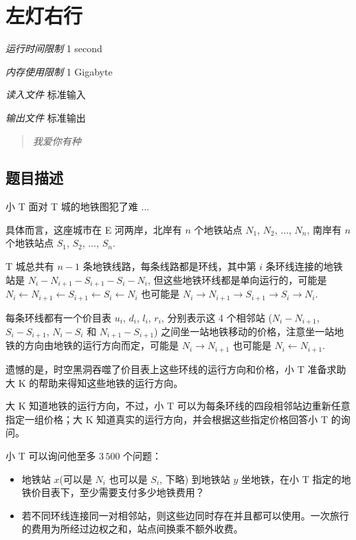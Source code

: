 \section[D. 左灯右行]{ 左灯右行}

\textit{运行时间限制}   1 second

\textit{内存使用限制} 1 Gigabyte

\textit{读入文件} \qquad 标准输入

\textit{输出文件} \qquad 标准输出


\begin{quote}
	\textit{我爱你有种}
\end{quote}



\subsection{题目描述}

小 T 面对 T 城的地铁图犯了难 ...

具体而言，这座城市在 E 河两岸，北岸有 $n$ 个地铁站点 $N_1$, $N_2$, $\ldots$, $N_n$, 南岸有 $n$ 个地铁站点 $S_1$, $S_2$, $\ldots$, $S_n$.

T 城总共有 $n - 1$ 条地铁线路，每条线路都是环线，其中第 $i$ 条环线连接的地铁站是 $N_i - N_{i + 1} - S_{i + 1} - S_i - N_i$, 但这些地铁环线都是单向运行的，可能是 $N_i \leftarrow N_{i + 1} \leftarrow S_{i + 1} \leftarrow S_i \leftarrow N_i$ 也可能是 $N_i \rightarrow N_{i + 1} \rightarrow S_{i + 1} \rightarrow S_i \rightarrow N_i$.


每条环线都有一个价目表 $u_i$, $d_i$, $l_i$, $r_i$, 分别表示这 4 个相邻站 ($N_i - N_{i + 1}$, $S_i - S_{i + 1}$, $N_i - S_i$ 和 $N_{i + 1} - S_{i + 1}$) 之间坐一站地铁移动的价格，注意坐一站地铁的方向由地铁的运行方向而定，可能是 $N_i \rightarrow N_{i + 1}$ 也可能是 $N_{i} \leftarrow N_{i + 1}$.

遗憾的是，时空黑洞吞噬了价目表上这些环线的运行方向和价格，小 T 准备求助大 K 的帮助来得知这些地铁的运行方向。

大 K 知道地铁的运行方向，不过，小 T 可以为每条环线的四段相邻站边重新任意指定一组价格；大 K 知道真实的运行方向，并会根据这些指定价格回答小 T 的询问。

小 T 可以询问他至多 $3\,500$ 个问题：

\begin{itemize}
	\item 地铁站 $x$(可以是 $N_i$ 也可以是 $S_i$, 下略) 到地铁站 $y$ 坐地铁，在小 T 指定的地铁价目表下，至少需要支付多少地铁费用？
   \item 若不同环线连接同一对相邻站，则这些边同时存在并且都可以使用。一次旅行的费用为所经过边权之和，站点间换乘不额外收费。
\end{itemize}


